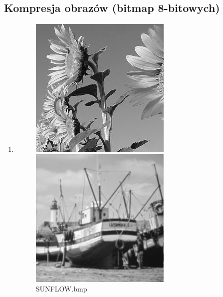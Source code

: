 \documentclass{article}
\begin{document}
\subsection{Kompresja obrazów (bitmap 8-bitowych)}
\begin{enumerate}
\item 
    \begin{figure}
            \includegraphics[width=\linewidth]{sunflow}
            \caption{SUNFLOW.bmp}
        \endminipage\hfill
            \includegraphics[width=\linewidth]{boats}

\end{figure}
\end{enumerate}
\end{document}

